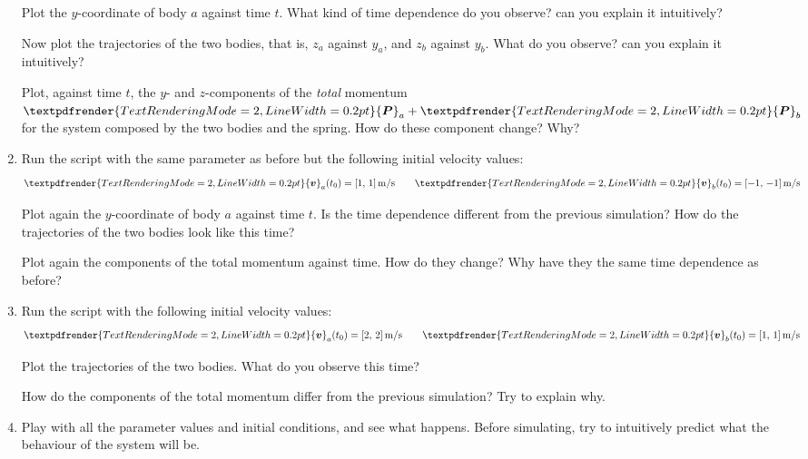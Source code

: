 \documentclass[a4paper,12pt,%
onecolumn,oneside,%
british%
]{memoir}
\renewcommand*{\bm}[1]{\textpdfrender{TextRenderingMode=2,LineWidth=0.2pt}{\boldsymbol{#1}}}
\renewcommand*{\|}[1][]{\nonscript\:#1\vert\nonscript\:\mathopen{}}
\newcommand*{\yv}{\bm{v}}
\newcommand*{\yva}{\yv_{a}}
\newcommand*{\yvb}{\yv_{b}}
\newcommand*{\yti}{t_{0}}
\newcommand*{\yP}{\bm{P}}
\newcommand*{\yPa}{\yP_{a}}
\newcommand*{\yPb}{\yP_{b}}
\begin{document}
\begin{exercise}[label={ex:hooke}]
\begin{enumerate}[exerc]
    Plot the $y$-coordinate of body $a$ against time $t$. What kind of time dependence do you observe? can you explain it intuitively?

    Now plot the trajectories of the two bodies, that is, $z_{a}$ against $y_{a}$, and $z_{b}$ against $y_{b}$. What do you observe? can you explain it intuitively?

    Plot, against time $t$, the $y$- and $z$-components of the \emph{total} momentum $\yPa+\yPb$ for the system composed by the two bodies and the spring. How do these component change? Why?

  \item Run the script with the same parameter as before but the following initial velocity values:
    \begin{equation*}
      \begin{gathered}
        \yva(\yti)=[\num{1},\, \num{1}]\,\unit{m/s}
        \qquad
        \yvb(\yti)=[\num{-1},\, \num{-1}]\,\unit{m/s}
      \end{gathered}
    \end{equation*}

    Plot again the $y$-coordinate of body $a$ against time $t$. Is the time dependence different from the previous simulation? How do the trajectories of the two bodies look like this time?

    Plot again the components of the total momentum against time. How do they change? Why have they the same time dependence as before?


      \item Run the script with the following initial velocity values:
    \begin{equation*}
      \begin{gathered}
        \yva(\yti)=[\num{2},\, \num{2}]\,\unit{m/s}
        \qquad
        \yvb(\yti)=[\num{1},\, \num{1}]\,\unit{m/s}
      \end{gathered}
    \end{equation*}

    Plot the trajectories of the two bodies. What do you observe this time?

    How do the components of the total momentum differ from the previous simulation? Try to explain why.

  \item Play with all the parameter values and initial conditions, and see what happens. Before simulating, try to intuitively predict what the behaviour of the system will be.
  \end{enumerate}
\end{exercise}
\end{document}
